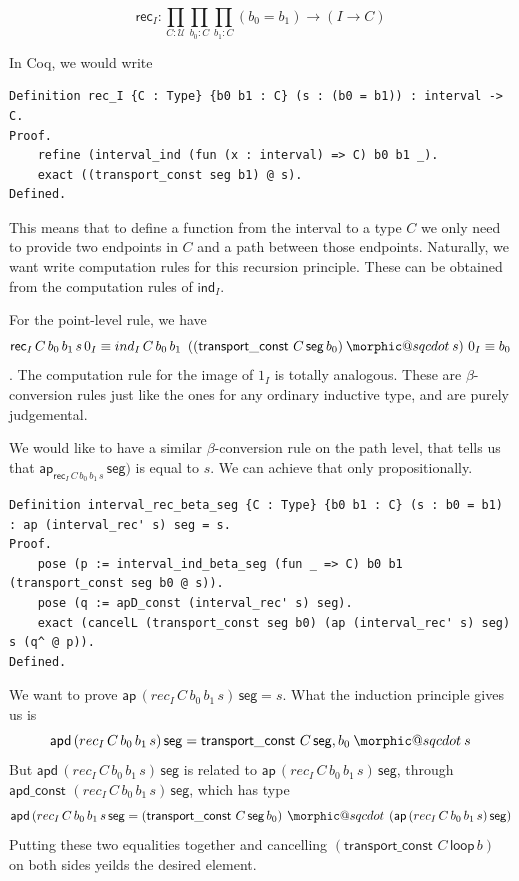 \documentclass[12 pt]{amsart}
\makeatletter
\theoremstyle{definition}
\theoremstyle{remark}
\newcommand{\Type}{\mathcal{U}}
\newcommand{\lo}{\mathsf{ loop}}
\newcommand{\trans}{\mathsf{transport}}
\newcommand{\ap}{\mathsf{ap}}
\newcommand{\apd}{\mathsf{apd}}
\newcommand{\seg}{{\mathsf{ seg}}}
\newcommand{\transconst}{{\mathsf{transport\_const}\,}}
\newcommand{\apdconst}{{\mathsf{apd\_const}}\,}
\DeclareRobustCommand{\conc}{\mathbin{\mathpalette\morphic@sqcdot\relax}}
\newcommand{\morphic@sqcdot}[2]{%
    \sbox\z@{$\m@th#1\centerdot$}%
    \ht\z@=.33333\ht\z@
    \vcenter{\box\z@}%
    }
\makeatother
\begin{document}
\[\mathsf{rec}_I : \prod_{C : \Type} \prod_{b_0 : C} \prod_{b_1 : C} (b_0 = b_1) \to (I \to C) \]

In Coq, we would write 
\begin{lstlisting}
Definition rec_I {C : Type} {b0 b1 : C} (s : (b0 = b1)) : interval -> C.
Proof.
    refine (interval_ind (fun (x : interval) => C) b0 b1 _).
    exact ((transport_const seg b1) @ s).
Defined.
\end{lstlisting}


This means that to define a function from the interval to a type $C$ we only need to provide two endpoints in $C$ and a path between those endpoints. Naturally, we want write computation rules for this recursion principle. These can be obtained from the computation rules of $\mathsf{ind}_I$. 

For the point-level rule, we have 
\[\mathsf{rec}_I \, C\, b_0\, b_1\, s\, 0_I \equiv {ind}_I \, C\, b_0\,b_1\, \,\left((\transconst\,C\, \seg\, b_0) \conc s\right) \, 0_I \equiv b_0\]. The computation rule for the image of $1_I$ is totally analogous. These are $\beta$-conversion rules just like the ones for any ordinary inductive type, and are purely judgemental.

We would like to have a similar $\beta$-conversion rule on the path level, that tells us that  $\ap_{\mathsf{rec}_I \, C\, b_0\, b_1 \, s} \,\seg)$ is equal to $s$. We can achieve that only propositionally.

\begin{lstlisting}
Definition interval_rec_beta_seg {C : Type} {b0 b1 : C} (s : b0 = b1) : ap (interval_rec' s) seg = s.
Proof.
    pose (p := interval_ind_beta_seg (fun _ => C) b0 b1 (transport_const seg b0 @ s)).
    pose (q := apD_const (interval_rec' s) seg).
    exact (cancelL (transport_const seg b0) (ap (interval_rec' s) seg) s (q^ @ p)).
Defined.
\end{lstlisting}

We want to prove $\ap\, (rec_I \,C\, b_0\,b_1 \,s) \, \seg = s$. What the induction principle gives us is 
\[\apd \, (rec_I \,C\, b_0\,b_1 \,s)\, \seg = \transconst\, C\, \seg, b_0 \conc s\]
But $\apd \, (rec_I \,C\, b_0\,b_1 \,s)\, \seg$ is related to $\ap\, (rec_I \,C\, b_0\,b_1 \,s) \, \seg$, through $\apdconst \,(rec_I \,C\, b_0\,b_1 \,s)\, \seg$, which has type
\[\apd \, (rec_I \,C\, b_0\,b_1 \,s\,\seg = (\transconst \,C\,\seg\,b_0) \,\conc\, (\ap \, (rec_I \,C\, b_0\,b_1 \,s)\,\seg )
 \]
Putting these two equalities together and cancelling $(\transconst\, C\, \lo\, b)$ on both sides yeilds the desired element.
\end{document}
